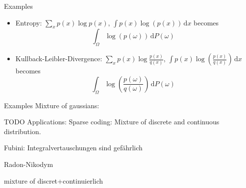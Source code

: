 \documentclass[compress]{beamer}
\newcommand{\td}{\,\mathrm{d}}  %
\begin{document}
\begin{frame}{Examples}
  \begin{itemize}
  \item Entropy: $\sum_x p(x)\log p(x)$, $\int p(x)\log(p(x))\td x$ becomes
   \[
     \int_{\Omega} \log(p(\omega))\td P(\omega)
   \]
 \item Kullback-Leibler-Divergence: $\sum_x p(x) \log\frac{p(x)}{q(x)}$, $\int
   p(x) \log\left(\frac{p(x)}{q(x)}\right) \td x$ becomes
   \[
     \int_{\Omega} \log\left(\frac{p(\omega)}{q(\omega)}\right) \td P(\omega)
   \]
  \end{itemize}
\end{frame}

\begin{frame}{Examples}
  Mixture of gaussians: 
\end{frame}

\begin{frame}{TODO}
  Applications: Sparse coding: Mixture of discrete and continuous distribution.

  Fubini: Integralvertauschungen sind gefährlich

  Radon-Nikodym

  mixture of discret+continuierlich
\end{frame}
\end{document}
